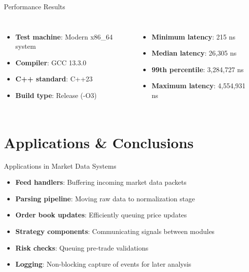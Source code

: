 \documentclass{beamer}
\begin{document}
\begin{frame}{Performance Results}
\begin{columns}
\begin{itemize}
    \item \textbf{Test machine}: Modern x86\_64 system
    \item \textbf{Compiler}: GCC 13.3.0
    \item \textbf{C++ standard}: C++23
    \item \textbf{Build type}: Release (-O3)
\end{itemize}

\begin{itemize}
    \item \textbf{Minimum latency}: 215 ns
    \item \textbf{Median latency}: 26,305 ns
    \item \textbf{99th percentile}: 3,284,727 ns
    \item \textbf{Maximum latency}: 4,554,931 ns
\end{itemize}
\end{columns}

\vspace{0.5cm}
\end{frame}

\section{Applications \& Conclusions}

\begin{frame}{Applications in Market Data Systems}
\begin{itemize}
    \item \textbf{Feed handlers}: Buffering incoming market data packets
    \item \textbf{Parsing pipeline}: Moving raw data to normalization stage
    \item \textbf{Order book updates}: Efficiently queuing price updates
    \item \textbf{Strategy components}: Communicating signals between modules
    \item \textbf{Risk checks}: Queuing pre-trade validations
    \item \textbf{Logging}: Non-blocking capture of events for later analysis
\end{itemize}
\end{frame}
\end{document}
